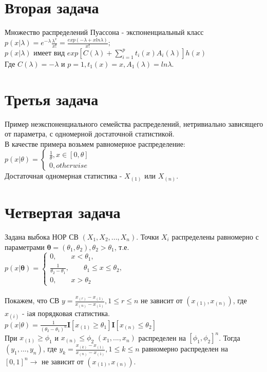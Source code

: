 \documentclass{article}
\begin{document}
\section{Вторая задача}
Множество распределений Пуассона - экспоненциальный класс\\
$p(x|\lambda) = e^{-\lambda}\frac{\lambda^x}{x!} = \frac{exp(-\lambda + xln\lambda)}{x!};$\\
$p(x|\lambda)$ имеет вид $exp[C(\lambda) + \sum\limits_{i=1}^{p}t_i(x)A_i(\lambda)]h(x)$\\
Где $C(\lambda) = -\lambda$ и $p = 1, t_1(x) = x, A_1(\lambda) = ln\lambda$.

\section{Третья задача}
Пример неэкспоненциального семейства распределений, нетривиально зависящего от параметра, с одномерной достаточной статистикой.\\
В качестве примера возьмем равномерное распределение:\\
$
p(x|\theta)=
\begin{cases}
\frac{1}{\theta}, x \in [0,\theta] \\
0, otherwise
\end{cases}
$\\
Достаточная одномерная статистика - $X_{(1)}$ или $X_{(n)}$.

\section{Четвертая задача}
Задана выбока НОР СВ $(X_1,X_2,...,X_n)$. Точки $X_i$ распределены равномерно с параметрами $\mathbf{\theta} = (\theta_1,\theta_2),\theta_2 > \theta_1$, т.е.\\
$
p(x|\mathbf{\theta})=
\begin{cases}
0, \qquad x < \theta_1, \\
\frac{1}{\theta_2 - \theta_1}, \qquad \theta_1 \leq x \leq \theta_2, \\
0, \qquad x > \theta_2
\end{cases}
$\\
\\
Покажем, что СВ $y = \frac{x_{(r)} - x_{(1)}}{x_{(n)} - x_{(1)}}, 1 \leq r \leq n$ не зависит от $(x_{(1)},x_{(n)})$, где $x_{(i)}$ - iая порядковая статистика.\\
$p(x|\theta) = \frac{1}{(\theta_2 - \theta_1)^n}\mathbf{I}[x_{(1)} \geq \theta_1]\mathbf{I}[x_{(n)} \leq \theta_2]$\\
При $x_{(1)} \geq \phi_1$ и $x_{(n)} \leq \phi_2 $ $(x_1,...,x_n)$ распределен на $[\phi_1,\phi_2]^n$.  Тогда $(y_1,...,y_n)$, где $y_k = \frac{x_{(k)}-x_{(1)}}{x_{(n)} - x_{(1)}}, 1 \leq k \leq n$ равномерно распределен на $[0,1]^n \to$ не зависит от $(x_{(1)},x_{(n)})$.  
\end{document}
